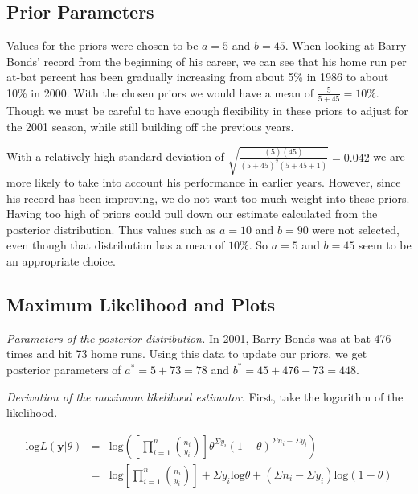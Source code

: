 \documentclass[12pt]{article}
\begin{document}
\subsection{Prior Parameters}

\noindent Values for the priors were chosen to be $a=5$ and $b=45$.  When looking at Barry Bonds' record from the beginning of his career, we can see that his home run per at-bat percent has been gradually increasing from about 5\% in 1986 to about 10\% in 2000.  With the chosen priors we would have a mean of $\frac{5}{5+45}=10\%$.  Though we must be careful to have enough flexibility in these priors to adjust for the 2001 season, while still building off the previous years.
\bigskip

\noindent With a relatively high standard deviation of $\sqrt{\frac{(5)(45)}{(5+45)^2(5+45+1)}}=0.042$ we are more likely to take into account his performance in earlier years.  However, since his record has been improving, we do not want too much weight into these priors.  Having too high of priors could pull down our estimate calculated from the posterior distribution.  Thus values such as $a=10$ and $b=90$ were not selected, even though that distribution has a mean of $10\%$.  So $a=5$ and $b=45$ seem to be an appropriate choice.
\bigskip


\subsection{Maximum Likelihood and Plots}



\noindent \textit{Parameters of the posterior distribution.}  In 2001, Barry Bonds was at-bat 476 times and hit 73 home runs.  Using this data to update our priors, we get posterior parameters of $a^*=5+73=78$ and $b^*=45+476-73=448$.
\bigskip

\noindent \textit{Derivation of the maximum likelihood estimator.}  First, take the logarithm of the likelihood.

\begin{eqnarray*}
\mathrm{log}L(\mathbf{y}|\theta)&=& \mathrm{log}\left(\left[\prod_{i=1}^n{n_i \choose y_i}\right]\theta^{\Sigma y_i}(1-\theta)^{\Sigma n_i-\Sigma y_i}\right) \\
&=& \mathrm{log}\left[\prod_{i=1}^n{n_i \choose y_i}\right]+\Sigma y_i\mathrm{log}\theta+(\Sigma n_i-\Sigma y_i)\mathrm{log}(1-\theta) \\
\end{eqnarray*}
\end{document}
